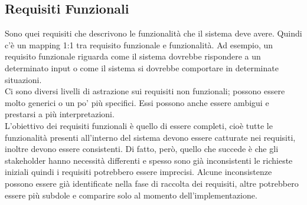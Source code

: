 \subsection{Requisiti Funzionali}
Sono quei requisiti che descrivono le funzionalità che il sistema deve avere.
Quindi c'è un mapping 1:1 tra requisito funzionale e funzionalità.
Ad esempio, un requisito funzionale riguarda come il sistema dovrebbe rispondere a un determinato input o come il sistema si dovrebbe comportare in determinate situazioni.\\
Ci sono diversi livelli di astrazione sui requisiti non funzionali; possono essere molto generici o un po' più specifici.
Essi possono anche essere ambigui e prestarsi a più interpretazioni.\\
L'obiettivo dei requisiti funzionali è quello di essere completi, cioè tutte le funzionalità presenti all'interno del sistema devono essere catturate nei requisiti, inoltre devono essere consistenti.
Di fatto, però, quello che succede è che gli stakeholder hanno necessità differenti e spesso sono già inconsistenti le richieste iniziali quindi i requisiti potrebbero essere imprecisi.
Alcune inconsistenze possono essere già identificate nella fase di raccolta dei requisiti, altre potrebbero essere più subdole e comparire solo al momento dell'implementazione.

